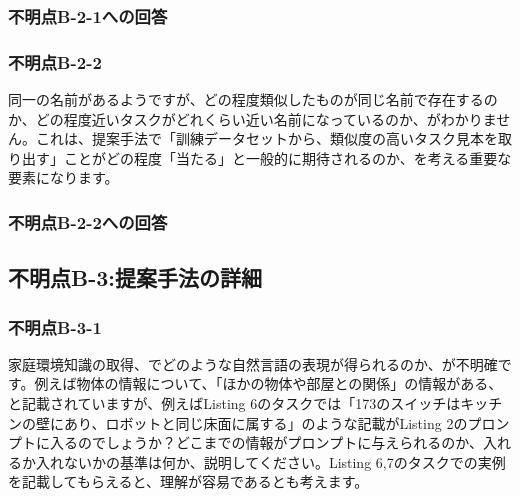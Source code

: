 \documentclass{jsarticle}
\begin{document}
\subsubsection*{不明点B-2-1への回答}


\subsubsection*{不明点B-2-2}
\begin{screen}
同一の名前があるようですが、どの程度類似したものが同じ名前で存在するのか、どの程度近いタスクがどれくらい近い名前になっているのか、がわかりません。これは、提案手法で「訓練データセットから、類似度の高いタスク見本を取り出す」ことがどの程度「当たる」と一般的に期待されるのか、を考える重要な要素になります。
\end{screen}

\subsubsection*{不明点B-2-2への回答}


\subsection*{不明点B-3:提案手法の詳細}
\subsubsection*{不明点B-3-1}
\begin{screen}
家庭環境知識の取得、でどのような自然言語の表現が得られるのか、が不明確です。例えば物体の情報について、「ほかの物体や部屋との関係」の情報がある、と記載されていますが、例えばListing 6のタスクでは「173のスイッチはキッチンの壁にあり、ロボットと同じ床面に属する」のような記載がListing 2のプロンプトに入るのでしょうか？どこまでの情報がプロンプトに与えられるのか、入れるか入れないかの基準は何か、説明してください。Listing 6,7のタスクでの実例を記載してもらえると、理解が容易であるとも考えます。
\end{screen}
\end{document}

